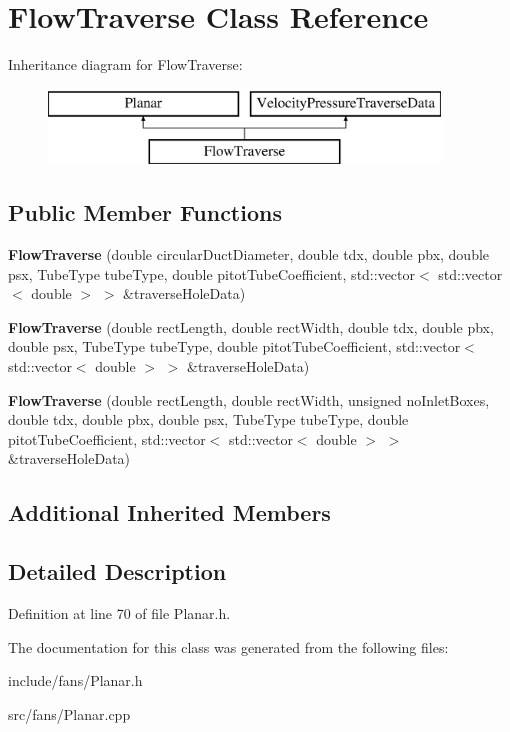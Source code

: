 \hypertarget{class_flow_traverse}{}\section{Flow\+Traverse Class Reference}
\label{class_flow_traverse}
Inheritance diagram for Flow\+Traverse\+:\begin{figure}[H]
\begin{center}
\leavevmode
\includegraphics[height=2.000000cm]{dc/dd3/class_flow_traverse}
\end{center}
\end{figure}
\subsection*{Public Member Functions}
\begin{DoxyCompactItemize}
\item 
\mbox{\label{class_flow_traverse_a88e2a8447584158659b291b76ada9d88}} 
{\bfseries Flow\+Traverse} (double circular\+Duct\+Diameter, double tdx, double pbx, double psx, Tube\+Type tube\+Type, double pitot\+Tube\+Coefficient, std\+::vector$<$ std\+::vector$<$ double $>$ $>$ \&traverse\+Hole\+Data)
\item 
\mbox{\label{class_flow_traverse_a3f9a1ff99526b121d2e458370a5b4961}} 
{\bfseries Flow\+Traverse} (double rect\+Length, double rect\+Width, double tdx, double pbx, double psx, Tube\+Type tube\+Type, double pitot\+Tube\+Coefficient, std\+::vector$<$ std\+::vector$<$ double $>$ $>$ \&traverse\+Hole\+Data)
\item 
\mbox{\label{class_flow_traverse_a082bf1746687b7d26db026f2321f8100}} 
{\bfseries Flow\+Traverse} (double rect\+Length, double rect\+Width, unsigned no\+Inlet\+Boxes, double tdx, double pbx, double psx, Tube\+Type tube\+Type, double pitot\+Tube\+Coefficient, std\+::vector$<$ std\+::vector$<$ double $>$ $>$ \&traverse\+Hole\+Data)
\end{DoxyCompactItemize}
\subsection*{Additional Inherited Members}


\subsection{Detailed Description}


Definition at line 70 of file Planar.\+h.



The documentation for this class was generated from the following files\+:\begin{DoxyCompactItemize}
\item 
include/fans/Planar.\+h\item 
src/fans/Planar.\+cpp\end{DoxyCompactItemize}
